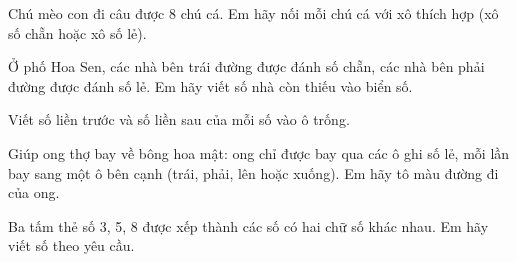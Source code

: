 \documentclass[../main.tex]{subfiles}
\begin{document}
\newpage
\begin{bt}
    Chú mèo con đi câu được 8 chú cá. Em hãy nối mỗi chú cá với xô thích hợp (xô số chẵn hoặc xô số lẻ).
    \par\nopagebreak\vspace{4pt}
\end{bt}

\begin{bt}
    Ở phố Hoa Sen, các nhà bên trái đường được đánh số chẵn, các nhà bên phải đường được đánh số lẻ. Em hãy viết số nhà còn thiếu vào biển số.
    \par\nopagebreak\vspace{4pt}
\end{bt}

\begin{bt}
    Viết số liền trước và số liền sau của mỗi số vào ô trống.
    \par\nopagebreak\vspace{4pt}
\end{bt}

\newpage
\begin{bt}
    Giúp ong thợ bay về bông hoa mật: ong chỉ được bay qua các ô ghi số lẻ, mỗi lần bay sang một ô bên cạnh (trái, phải, lên hoặc xuống). Em hãy tô màu đường đi của ong.
    \par\nopagebreak\vspace{4pt}
\end{bt}

\begin{bt}
    Ba tấm thẻ số 3, 5, 8 được xếp thành các số có hai chữ số khác nhau. Em hãy viết số theo yêu cầu.
    \par\nopagebreak\vspace{4pt}
    \begin{listEX}
        \item {}
        \item {}
    \end{listEX}
\end{bt}
\end{document}
